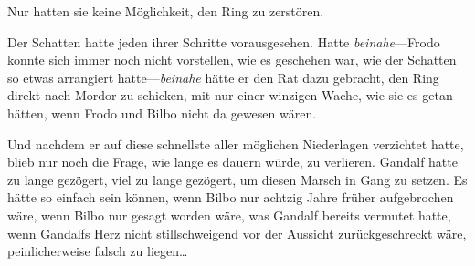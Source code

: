 Nur hatten sie keine Möglichkeit, den Ring zu zerstören.

Der Schatten hatte jeden ihrer Schritte vorausgesehen. Hatte \emph{beinahe}—Frodo konnte sich immer noch nicht vorstellen, wie es geschehen war, wie der Schatten so etwas arrangiert hatte—\emph{beinahe} hätte er den Rat dazu gebracht, den Ring direkt nach Mordor zu schicken, mit nur einer winzigen Wache, wie sie es getan hätten, wenn Frodo und Bilbo nicht da gewesen wären.

Und nachdem er auf diese schnellste aller möglichen Niederlagen verzichtet hatte, blieb nur noch die Frage, wie lange es dauern würde, zu verlieren. Gandalf hatte zu lange gezögert, viel zu lange gezögert, um diesen Marsch in Gang zu setzen. Es hätte so einfach sein können, wenn Bilbo nur achtzig Jahre früher aufgebrochen wäre, wenn Bilbo nur gesagt worden wäre, was Gandalf bereits vermutet hatte, wenn Gandalfs Herz nicht stillschweigend vor der Aussicht zurückgeschreckt wäre, peinlicherweise falsch zu liegen…

